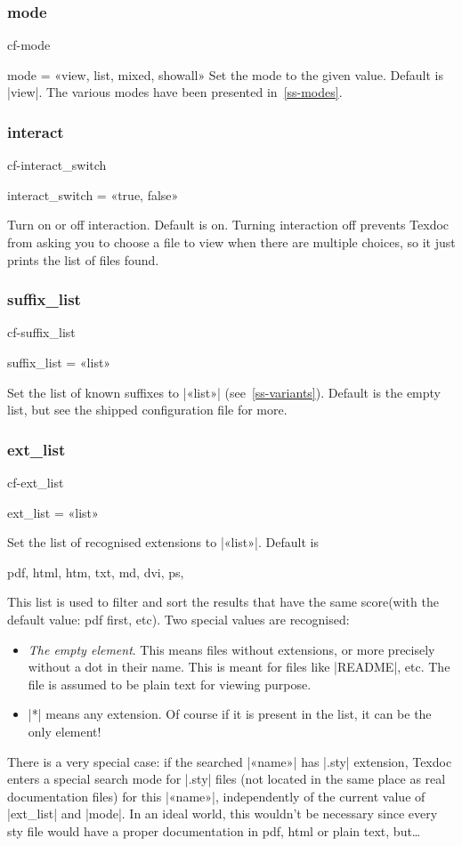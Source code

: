 \documentclass[a4paper, oneside]{scrartcl}
\makeatletter
\newif\ifframed
\newenvironment{cmdsubsub}[2]{%
  \framedfalse \commandes\subsubsection{#1}{#2}%
  }{%
  \endcommandes}
\newenvironment{htcode}{%
  \SaveVerbatim[samepage, gobble=2]{verbmat}%
  }{%
  \endSaveVerbatim
  \par\medskip\noindent\hspace*{\parindent}%
  \BUseVerbatim{verbmat}%
  \par\medskip\@endpetrue}
\makeatother
\begin{document}
\begin{cmdsubsub}{mode}{cf-mode}
  mode = «view, list, mixed, showall»
\end{cmdsubsub}
Set the  mode to the given value.  Default is |view|. The various modes
have been presented in~\ref{ss-modes}.

\begin{cmdsubsub}{interact}{cf-interact_switch}
  interact_switch = «true, false»
\end{cmdsubsub}

Turn on or off interaction.  Default is on.  Turning interaction off prevents
Texdoc from asking you to choose a file to view when there are multiple
choices, so it just prints the list of files found.

\begin{cmdsubsub}{suffix_list}{cf-suffix_list}
  suffix_list = «list»
\end{cmdsubsub}

Set the list of known suffixes to |«list»| (see~\ref{ss-variants}). Default is
the empty list, but see the shipped configuration file for more.

\begin{cmdsubsub}{ext_list}{cf-ext_list}
  ext_list = «list»
\end{cmdsubsub}

Set the list of recognised extensions to |«list»|.  Default is
\begin{htcode}
  pdf, html, htm, txt, md, dvi, ps,
\end{htcode}
This list is used to filter and  sort the results that have the same
score(with the default value: pdf first, etc).  Two special values are
recognised:
\begin{itemize}
  \item \emph{The empty element}. This means files without extensions, or more
    precisely without a dot in their name.  This is meant for files like
    |README|, etc.  The file is assumed to be plain text for viewing purpose.
  \item |*| means any extension.  Of course if it is present in the list, it
    can be the only element!
\end{itemize}

There is a very special case: if the searched |«name»| has |.sty| extension,
Texdoc enters a special search mode for |.sty| files (not located in the same
place as real documentation files) for this |«name»|, independently of the
current value of |ext_list| and |mode|. In an ideal world, this wouldn't be
necessary since every sty file would have a proper documentation in pdf, html
or plain text, but\dots
\end{document}
